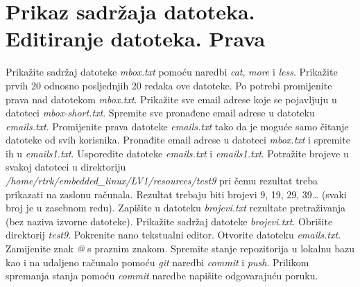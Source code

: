 \documentclass[11pt]{article}
\begin{document}
\section{Prikaz sadržaja datoteka. Editiranje datoteka. Prava}
Prikažite sadržaj datoteke \textit{mbox.txt} pomoću naredbi \textit{cat},
 \textit{more} i \textit{less}. Prikažite prvih 20 odnosno posljednjih 20
 redaka ove datoteke. Po potrebi promijenite prava nad datotekom
 \textit{mbox.txt}.
\newline
\newline
Prikažite sve email adrese koje se pojavljuju u datoteci
 \textit{mbox-short.txt}. Spremite sve pronađene email adrese u datoteku
 \textit{emails.txt}. Promijenite prava datoteke \textit{emails.txt} tako da je
 moguće samo čitanje datoteke od svih korisnika.
\newline
\newline
Pronađite email adrese u datoteci \textit{mbox.txt} i spremite ih u
 \textit{emails1.txt}. Usporedite datoteke \textit{emails.txt} i
 \textit{emails1.txt}. Potražite brojeve u svakoj datoteci u direktoriju \\
 \textit{/home/rtrk/embedded\_linux/LV1/resources/test9} pri čemu rezultat
 treba prikazati na zaslonu računala. Rezultat trebaju biti brojevi 9, 19, 29,
 39… (svaki broj je u zasebnom redu). Zapišite u datoteku \textit{brojevi.txt}
 rezultate pretraživanja (bez naziva izvorne datoteke). Prikažite sadržaj
 datoteke \textit{brojevi.txt}. Obrišite direktorij \textit{test9}.
\newline
\newline
Pokrenite nano tekstualni editor. Otvorite datoteku \textit{emails.txt}.
 Zamijenite znak \textit{@} s praznim znakom.
\newline
\newline
Spremite stanje repozitorija u lokalnu bazu kao i na udaljeno računalo pomoću
 \textit{git} naredbi \textit{commit} i \textit{push}. Prilikom spremanja
 stanja pomoću \textit{commit} naredbe napišite odgovarajuću poruku.
\end{document}
